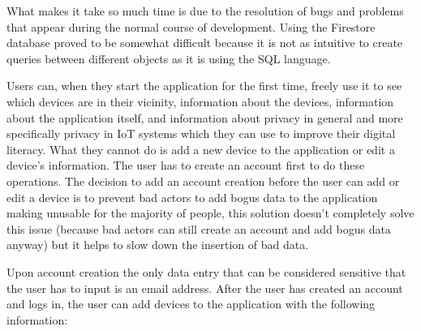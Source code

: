 What makes it take so much time is due to the resolution of bugs and
problems that appear during the normal course of development. Using
the Firestore database proved to be somewhat difficult because
it is not as intuitive to create queries between different objects
as it is using the SQL language.

Users can, when they start the application for the first time, freely use it to see
which devices are in their vicinity,
information about the devices, information about the application itself, and
information about privacy in general and more specifically privacy in IoT systems
which they can use to improve their digital literacy. What they cannot do is
add a new device to the application or edit a device's information. The user has
to create an account first to do these operations. The decision to add an
account creation before the user can add or edit a device is to prevent
bad actors to add bogus data to the application making unusable for the majority
of people, this solution doesn't completely solve this issue (because bad actors
can still create an account and add bogus data anyway) but it helps to slow
down the insertion of bad data.

Upon account creation the only data entry that can be considered sensitive that
the user has to input is an email address.
After the user has created an account and logs in, the user can add devices to the application with the following information:

